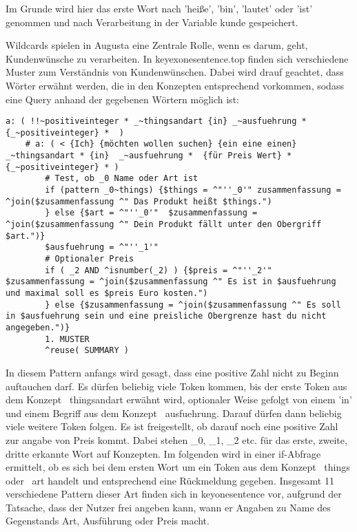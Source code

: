Im Grunde wird hier das erste Wort nach 'heiße', 'bin', 'lautet' oder 'ist' genommen und nach Verarbeitung in der Variable kunde gespeichert. 

Wildcards spielen in Augusta eine Zentrale Rolle, wenn es darum, geht, Kundenwünsche zu verarbeiten. In keyexonesentence.top finden sich verschiedene Muster zum Verständnis von Kundenwünschen. Dabei wird drauf geachtet, dass Wörter erwähnt werden, die in den Konzepten entsprechend vorkommen, sodass eine Query anhand der gegebenen Wörtern möglich ist: 

\begin{lstlisting}[caption={Muster 1 in keyexonesentence.top}]
    a: ( !!~positiveinteger * _~thingsandart {in} _~ausfuehrung * {_~positiveinteger} *  )
    # a: ( < {Ich} {möchten wollen suchen} {ein eine einen} _~thingsandart * {in}  _~ausfuehrung *  {für Preis Wert} * {_~positiveinteger} * )
        # Test, ob _0 Name oder Art ist
        if (pattern _0~things) {$things = ^"''_0'" zusammenfassung = ^join($zusammenfassung ^" Das Produkt heißt $things.")
        } else {$art = ^"''_0'"  $zusammenfassung = ^join($zusammenfassung ^" Dein Produkt fällt unter den Obergriff $art.")}
        $ausfuehrung = ^"''_1'"
        # Optionaler Preis
        if ( _2 AND ^isnumber(_2) ) {$preis = ^"''_2'" $zusammenfassung = ^join($zusammenfassung ^" Es ist in $ausfuehrung und maximal soll es $preis Euro kosten.")
        } else {$zusammenfassung = ^join($zusammenfassung ^" Es soll in $ausfuehrung sein und eine preisliche Obergrenze hast du nicht angegeben.")}
        1. MUSTER
        ^reuse( SUMMARY )
\end{lstlisting}
        
In diesem Pattern anfangs wird gesagt, dass eine positive Zahl nicht zu Beginn auftauchen darf. Es dürfen beliebig viele Token kommen, bis der erste Token aus dem Konzept ~thingsandart erwähnt wird, optionaler Weise gefolgt von einem 'in' und einem Begriff aus dem Konzept ~ausfuehrung. Darauf dürfen dann beliebig viele weitere Token folgen. Es ist freigestellt, ob darauf noch eine positive Zahl zur angabe von Preis kommt. Dabei stehen _0, _1, _2 etc. für das erste, zweite, dritte erkannte Wort auf Konzepten. Im folgenden wird in einer if-Abfrage ermittelt, ob es sich bei dem ersten Wort um ein Token aus dem Konzept ~things oder ~art handelt und entsprechend eine Rückmeldung gegeben. 
Insgesamt 11 verschiedene Pattern dieser Art finden sich in keyonesentence vor, aufgrund der Tatsache, dass der Nutzer frei angeben kann, wann er Angaben zu Name des Gegenstands Art, Ausführung oder Preis macht. 

